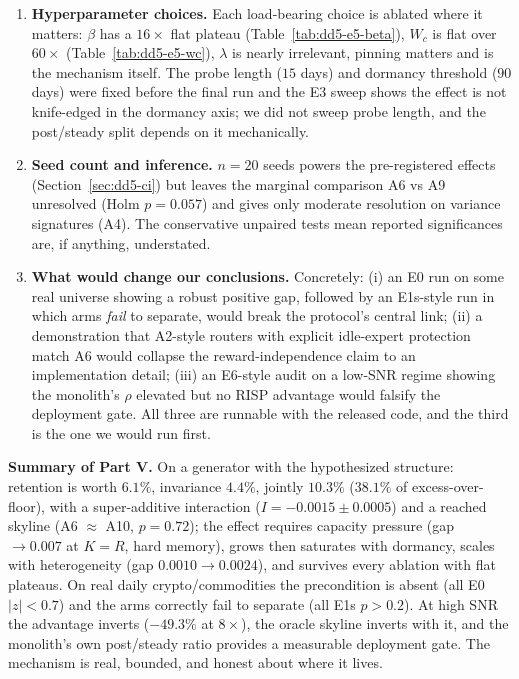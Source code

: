 \begin{enumerate}
easy.
\item \textbf{Hyperparameter choices.} Each load-bearing choice is ablated
where it matters: $\beta$ has a $16\times$ flat plateau
(Table~\ref{tab:dd5-e5-beta}), $W_c$ is flat over $60\times$
(Table~\ref{tab:dd5-e5-wc}), $\lambda$ is nearly irrelevant, pinning
matters and is the mechanism itself. The probe length ($15$ days) and
dormancy threshold ($90$ days) were fixed before the final run and the E3
sweep shows the effect is not knife-edged in the dormancy axis; we did not
sweep probe length, and the post/steady split depends on it mechanically.
\item \textbf{Seed count and inference.} $n = 20$ seeds powers the
pre-registered effects (Section~\ref{sec:dd5-ci}) but leaves the marginal
comparison A6 vs A9 unresolved (Holm $p = 0.057$) and gives only moderate
resolution on variance signatures (A4). The conservative unpaired tests
mean reported significances are, if anything, understated.
\item \textbf{What would change our conclusions.} Concretely: (i) an E0 run
on some real universe showing a robust positive gap, followed by an E1s-style
run in which arms \emph{fail} to separate, would break the protocol's
central link; (ii) a demonstration that A2-style routers with explicit
idle-expert protection match A6 would collapse the
reward-independence claim to an implementation detail; (iii) an E6-style
audit on a low-SNR regime showing the monolith's $\rho$ elevated but no
RISP advantage would falsify the deployment gate. All three are
runnable with the released code, and the third is the one we would run
first.
\end{enumerate}

\begin{keypoint}
\textbf{Summary of Part V.} On a generator with the hypothesized structure:
retention is worth $6.1\%$, invariance $4.4\%$, jointly $10.3\%$
($38.1\%$ of excess-over-floor), with a super-additive interaction
($I = -0.0015 \pm 0.0005$) and a reached skyline (A6 $\approx$ A10,
$p = 0.72$); the effect requires capacity pressure (gap $\to 0.007$ at
$K = R$, hard memory), grows then saturates with dormancy, scales with
heterogeneity (gap $0.0010 \to 0.0024$), and survives every ablation with
flat plateaus. On real daily crypto/commodities the precondition is absent
(all E0 $|z| < 0.7$) and the arms correctly fail to separate (all
E1s $p > 0.2$). At high SNR the advantage inverts ($-49.3\%$ at $8\times$),
the oracle skyline inverts with it, and the monolith's own post/steady
ratio provides a measurable deployment gate. The mechanism is real,
bounded, and honest about where it lives.
\end{keypoint}
